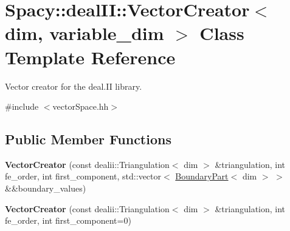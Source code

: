 \hypertarget{classSpacy_1_1dealII_1_1VectorCreator}{\section{\-Spacy\-:\-:deal\-I\-I\-:\-:\-Vector\-Creator$<$ dim, variable\-\_\-dim $>$ \-Class \-Template \-Reference}
\label{classSpacy_1_1dealII_1_1VectorCreator}
}


\-Vector creator for the deal.\-I\-I library.  




{\ttfamily \#include $<$vector\-Space.\-hh$>$}

\subsection*{\-Public \-Member \-Functions}
\begin{DoxyCompactItemize}
\item 
\hypertarget{classSpacy_1_1dealII_1_1VectorCreator_acdbdf15ebaa767034a45e611c848e24e}{{\bfseries \-Vector\-Creator} (const dealii\-::\-Triangulation$<$ dim $>$ \&triangulation, int fe\-\_\-order, int first\-\_\-component, std\-::vector$<$ \hyperlink{structSpacy_1_1dealII_1_1BoundaryPart}{\-Boundary\-Part}$<$ dim $>$ $>$ \&\&boundary\-\_\-values)}\label{classSpacy_1_1dealII_1_1VectorCreator_acdbdf15ebaa767034a45e611c848e24e}

\item 
\hypertarget{classSpacy_1_1dealII_1_1VectorCreator_ae5996e34a144dd1accdab9822f2564b1}{{\bfseries \-Vector\-Creator} (const dealii\-::\-Triangulation$<$ dim $>$ \&triangulation, int fe\-\_\-order, int first\-\_\-component=0)}\label{classSpacy_1_1dealII_1_1VectorCreator_ae5996e34a144dd1accdab9822f2564b1}

\end{DoxyCompactItemize}
